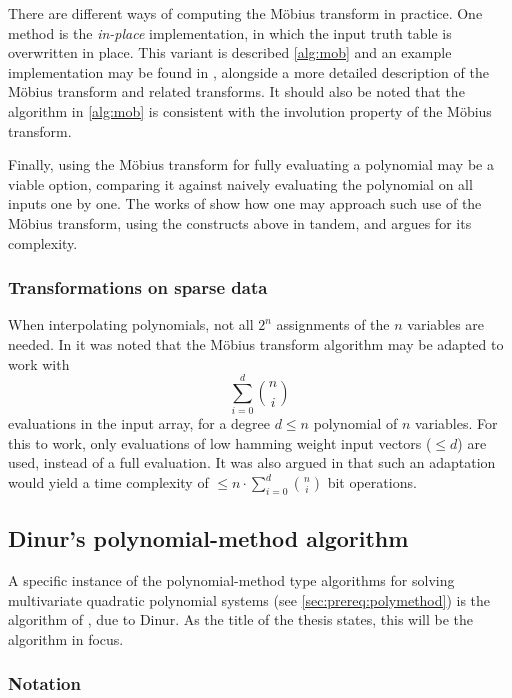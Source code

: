 There are different ways of computing the Möbius transform in practice. One method is the \textit{in-place} implementation, in which the input truth table is overwritten in place. This variant is described \cref{alg:mob} and an example implementation may be found in \cite{joux2009algorithmic}, alongside a more detailed description of the Möbius transform and related transforms. It should also be noted that the algorithm in \cref{alg:mob} is consistent with the involution property of the Möbius transform.

Finally, using the Möbius transform for fully evaluating a polynomial may be a viable option, comparing it against naively evaluating the polynomial on all inputs one by one. The works of \cite{10.1007/978-3-642-21702-9_6} show how one may approach such use of the Möbius transform, using the constructs above in tandem, and argues for its complexity.

\subsubsection{Transformations on sparse data}
When interpolating polynomials, not all $2^n$ assignments of the $n$ variables are needed. In \cite{cryptoeprint:2021/578} it was noted that the Möbius transform algorithm may be adapted to work with 
$$
    \sum_{i = 0}^{d} \binom{n}{i}
$$
evaluations in the input array, for a degree $d \leq n$ polynomial of $n$ variables. For this to work, only evaluations of low hamming weight input vectors ($\leq d$) are used, instead of a full evaluation. It was also argued in \cite{cryptoeprint:2021/578} that such an adaptation would yield a time complexity of $\leq n \cdot \sum_{i = 0}^{d}\binom{n}{i}$ bit operations.

\subsection{Dinur's polynomial-method algorithm}
A specific instance of the polynomial-method type algorithms for solving multivariate quadratic polynomial systems (see \cref{sec:prereq:polymethod}) is the algorithm of \cite{cryptoeprint:2021/578}, due to Dinur. As the title of the thesis states, this will be the algorithm in focus.

\subsubsection{Notation} \label{sec:prereq:dinur:notation}

